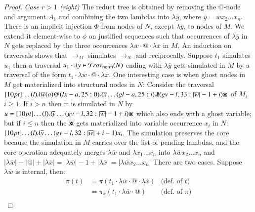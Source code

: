 \documentclass{elsarticle}
\newif\iflongversion
\theoremstyle{plain}
\theoremstyle{definition}
\newcommand{\ghostlmd}{{\lambda\mkern-7mu \lambda}}
\newcommand{\ghostvar}{\mathsf{x\mkern-5mu x}}
\newcommand{\normalizing}{{\sf norm}}
\newcommand{\travsetnorm}{\travset_\normalizing} %
\def\coresymbol{\pi} %
\begin{document}
\begin{proof}
\noindent
\emph{Case $r>1$ (right)} The reduct tree is obtained by removing the @-node and argument $A_1$ and combining the two lambdas into $\lambda\overline{y}$,
where $\overline{y} = \overline{w} x_2 \ldots x_n$.
%
There is an implicit injection $\Phi$ from nodes of $N$, except $\lambda\overline{y}$, to nodes of $M$.
We extend it element-wise to $\phi$ on justified sequences
such that occurrences of $\lambda\overline{y}$ in $N$ gets replaced by the three occurrences $\lambda\overline{w} \cdot @ \cdot \lambda\overline{x}$ in $M$.
%
An induction on traversals shows that $\rightarrow_M$ simulates $\rightarrow_N$ and reciprocally.
%
Suppose $t_1$ simulates $u_1$ then a
 traversal $u_1 \cdot \lambda\overline{y} \in \travsetnorm(N)$
ending with $\lambda\overline{y}$
gets simulated in $M$ by a traversal of the form
$t_1 \cdot \lambda\overline{w} \cdot @ \cdot \lambda\overline{x}$.
%
One interesting case is when ghost nodes in $M$ get materialized into structural nodes in $N$:
Consider the traversal
$\Pstr[10pt]{\ldots
    (l){\lambda\overline{w}}  (a)@  (lx-a,25:0){\lambda\overline{x}} \ldots (gl-a,25:i)\ghostlmd  (gv-l,33:{|\overline{w}|-1+i})\ghostvar }
$ of $M$, $i\geq1$.
If $i>n$ then it is simulated in $N$
by $u = \Pstr[10pt]{\ldots
    (l){\lambda\overline y}  \ldots   (gv-l,32:{|\overline{w}|-1+i})\ghostvar }
$ which also ends with a ghost variable;
but if $i\leq n$ then the $\ghostvar$ gets materialized into variable occurrence $x_i$ in $N$:
$\Pstr[10pt]{
    \ldots  (l){\lambda\overline y} \ldots  (gv-l,32:{|\overline{w}|+i-1}){x_i} }
$.
%
    The simulation preserves the core because the simulation in $M$
    carries over the list of pending lambdas, and the core operation adequately merges $\lambda\overline{w}$ and $\lambda x_1 \ldots x_n$ into
    $\lambda\overline{w} x_2 \ldots x_n$
and
    $|\lambda\overline{w}| - |@| + |\lambda\overline{x}|
    =|\lambda\overline{w}| - 1 + |\lambda\overline{x}|
    =|\lambda\overline{w}x_2\ldots x_n|
    $
\iflongversion
    There are two cases. Suppose $\lambda\overline{w}$ is internal, then:
    \begin{align*}
        \coresymbol(t)
        &=  \coresymbol(t_1 \cdot \lambda\overline{w} \cdot @ \cdot \lambda\overline{x})
            & \mbox{(def.~of $t$)}
        \\
        &=  \coresymbol_{\overline{x}}(t_1 \cdot
        \lambda\overline{w} \cdot @)
            & \mbox{(def.~of $\coresymbol$)}
        \\

\end{align*}
\end{proof}
\end{document}
